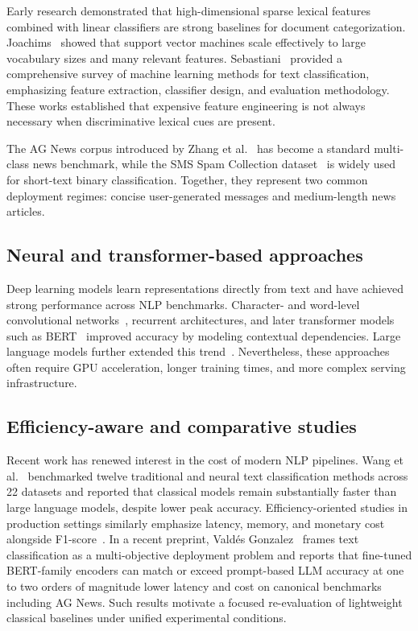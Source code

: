\documentclass[pdflatex,sn-mathphys-num]{sn-jnl}
\begin{document}
Early research demonstrated that high-dimensional sparse lexical features combined with linear classifiers are strong baselines for document categorization. Joachims~\cite{joachims1998text} showed that support vector machines scale effectively to large vocabulary sizes and many relevant features. Sebastiani~\cite{sebastiani2002machine} provided a comprehensive survey of machine learning methods for text classification, emphasizing feature extraction, classifier design, and evaluation methodology. These works established that expensive feature engineering is not always necessary when discriminative lexical cues are present.

The AG News corpus introduced by Zhang et al.~\cite{zhang2015character} has become a standard multi-class news benchmark, while the SMS Spam Collection dataset~\cite{almeida2011sms} is widely used for short-text binary classification. Together, they represent two common deployment regimes: concise user-generated messages and medium-length news articles.

\subsection{Neural and transformer-based approaches}

Deep learning models learn representations directly from text and have achieved strong performance across NLP benchmarks. Character- and word-level convolutional networks~\cite{zhang2015character}, recurrent architectures, and later transformer models such as BERT~\cite{devlin2019bert} improved accuracy by modeling contextual dependencies. Large language models further extended this trend~\cite{brown2020language}. Nevertheless, these approaches often require GPU acceleration, longer training times, and more complex serving infrastructure.

\subsection{Efficiency-aware and comparative studies}

Recent work has renewed interest in the cost of modern NLP pipelines. Wang et al.~\cite{wang2024atcbench} benchmarked twelve traditional and neural text classification methods across 22 datasets and reported that classical models remain substantially faster than large language models, despite lower peak accuracy. Efficiency-oriented studies in production settings similarly emphasize latency, memory, and monetary cost alongside F1-score~\cite{schneider2025slm}. In a recent preprint, Vald\'es Gonzalez~\cite{valdes2026costaware} frames text classification as a multi-objective deployment problem and reports that fine-tuned BERT-family encoders can match or exceed prompt-based LLM accuracy at one to two orders of magnitude lower latency and cost on canonical benchmarks including AG News. Such results motivate a focused re-evaluation of lightweight classical baselines under unified experimental conditions.
\end{document}

